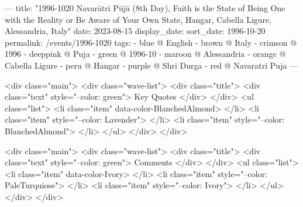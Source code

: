 ---
title: "1996-1020 Navarātri Pūjā (8th Day), Faith is the State of Being One with the Reality or Be Aware of Your Own State, Hangar, Cabella Ligure, Alessandria, Italy"
date: 2023-08-15
display_date: 
sort_date: 1996-10-20
permalink: /events/1996-1020
tags:
  - blue @ English
  - brown @ Italy
  - crimson @ 1996
  - deeppink @ Puja
  - green @ 1996-10
  - maroon @ Alessandria
  - orange @ Cabella Ligure
  - peru @ Hangar
  - purple @ Shri Durga 
  - red @ Navaratri Puja
---

<div class="main">
  <div class="wave-list">
    <div class="title">
      <div class="text" style="--color: green">
        Key Quotes
      </div>
    </div>
    <ul class="list">
        <li class="item" data-color-BlanchedAlmond>
        </li>
        <li class="item" style="--color: Lavender">
        </li>
        <li class="item" style="--color: BlanchedAlmond">
        </li>
      </ul>
  </div>
</div>

<div class="main">
  <div class="wave-list">
    <div class="title">
      <div class="text" style="--color: green">
        Comments
      </div>
    </div>
    <ul class="list">
        <li class="item" data-color-Ivory>
        </li>
        <li class="item" style="--color: PaleTurquiose">
        </li>
        <li class="item" style="--color: Ivory">
        </li>
      </ul>
  </div>
</div>